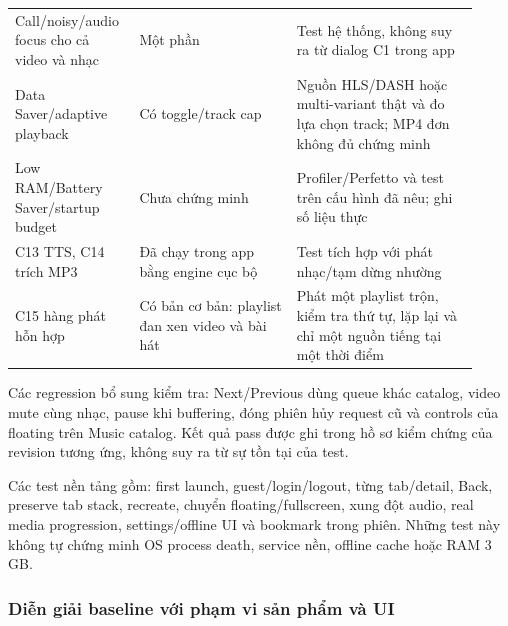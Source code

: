 \begin{longtable}{>{\RaggedRight\arraybackslash}p{0.23\linewidth}>{\RaggedRight\arraybackslash}p{0.32\linewidth}>{\RaggedRight\arraybackslash}p{0.37\linewidth}}
Call/noisy/audio focus cho cả video và nhạc & Một phần & Test hệ thống, không suy ra từ dialog C1 trong app \\
Data Saver/adaptive playback & Có toggle/track cap & Nguồn HLS/DASH hoặc multi-variant thật và đo lựa chọn track; MP4 đơn không đủ chứng minh \\
Low RAM/Battery Saver/startup budget & Chưa chứng minh & Profiler/Perfetto và test trên cấu hình đã nêu; ghi số liệu thực \\
C13 TTS, C14 trích MP3 & Đã chạy trong app bằng engine cục bộ & Test tích hợp với phát nhạc/tạm dừng nhường \\
C15 hàng phát hỗn hợp & Có bản cơ bản: playlist đan xen video và bài hát & Phát một playlist trộn, kiểm tra thứ tự, lặp lại và chỉ một nguồn tiếng tại một thời điểm \\
\end{longtable}
\endgroup

Các regression bổ sung kiểm tra: Next/Previous dùng queue khác catalog, video mute cùng nhạc, pause khi buffering, đóng phiên hủy request cũ và controls của floating trên Music catalog. Kết quả pass được ghi trong hồ sơ kiểm chứng của revision tương ứng, không suy ra từ sự tồn tại của test.

Các test nền tảng gồm: first launch, guest/login/logout, từng tab/detail, Back, preserve tab stack, recreate, chuyển floating/fullscreen, xung đột audio, real media progression, settings/offline UI và bookmark trong phiên. Những test này không tự chứng minh OS process death, service nền, offline cache hoặc RAM 3 GB.

\subsubsection{Diễn giải baseline với phạm vi sản phẩm và UI}

